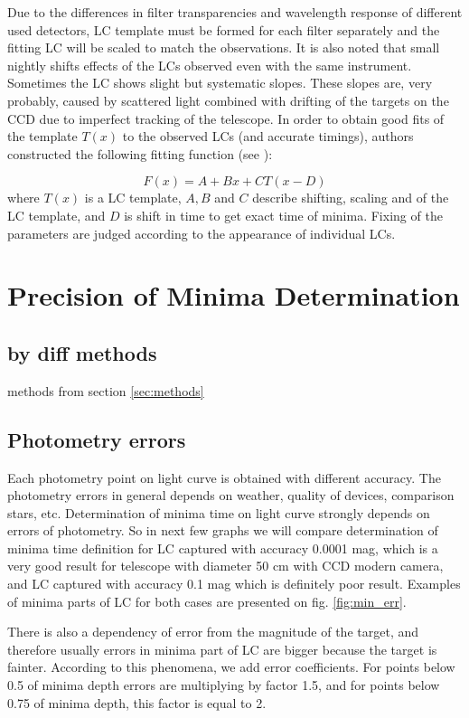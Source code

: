 Due to the differences in filter transparencies and wavelength response of different used detectors, 
LC template must be formed for each filter separately and the fitting LC will be scaled to match the observations.
It is also noted that small nightly shifts effects of the LCs observed even with the same
instrument. Sometimes the LC shows slight but systematic slopes. These slopes are, very probably, caused by scattered
light combined with drifting of the targets on the CCD due to imperfect tracking of the telescope.
In order to obtain good fits of the template $T(x)$ to the observed LCs (and accurate timings), authors constructed the following
fitting function (see \cite{Pribulla2008}):

\begin{equation}\label{eq:dwarf1}
F(x) = A+Bx+CT(x-D)
\end{equation}
where $T(x)$ is a LC template, $A,B$ and $C$ describe shifting,
scaling and  of the LC template, and $D$ is shift in time to get exact time of minima. Fixing of the
parameters are judged according to the appearance of individual LCs.  

\section{Precision of Minima Determination}
\subsection {by diff methods}
methods from section \ref{sec:methods}

\subsection{Photometry errors}
Each photometry point on light curve is obtained with different accuracy. The photometry errors in general depends on weather, quality of devices, comparison stars, etc.
Determination of minima time on light curve strongly depends on errors of photometry. So in next few graphs we will compare determination of minima time definition for LC captured with accuracy 0.0001 mag, which is a very good result for telescope with diameter 50 cm with CCD modern camera, and LC captured with accuracy 0.1 mag which is definitely poor result. Examples of minima parts of LC for both cases are presented on fig. \ref{fig:min_err}.

There is also a dependency of error from the magnitude of the target, and therefore usually errors in minima part of LC are bigger because the target is fainter. According to this phenomena, we add error coefficients. For points below 0.5 of minima depth errors are multiplying by factor 1.5, and for points below 0.75 of minima depth, this factor is equal to 2.    

